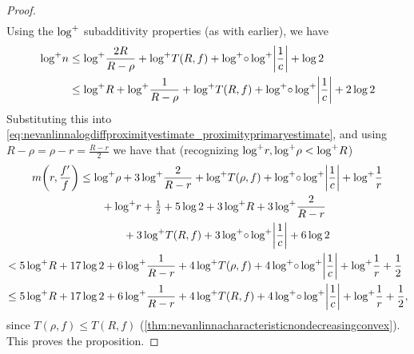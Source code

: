\begin{proof}
\begin{align*}
    \end{align*}
    Using the \(\mathop{\log^+\!}{}\) subadditivity properties (as with earlier), we have
    \begin{align*}
        \logp{n}&\leq\logp{\frac{2R}{R-\rho}}+\logp T(R,f)+\logp\circ\logp\abs{\frac1c}+\log 2\\
        &\leq\logp R+\logp{\frac{1}{R-\rho}}+\logp T(R,f)+\logp\circ\logp\abs{\frac1c}+2\log 2
    \end{align*}
    Substituting this into \cref{eq:nevanlinnalogdiffproximityestimate_proximityprimaryestimate}, and using \(R-\rho=\rho-r=\tfrac{R-r}2\) we have that (recognizing \(\mathop{\log^+\!} r,\mathop{\log^+\!}\rho<\mathop{\log^+\!} R\))
    \begin{multline*}
        \begin{aligned}
            m\qty(r,\frac{f'}f)&\leq\logp\rho+3\logp\frac{2}{R-r}+\logp T(\rho,f)+\logp\circ\logp\abs{\frac1{c}}+\logp\frac{1}{r}\nonumber\\
            &\qquad+\logp r+\tfrac12+5\log2+3\logp R+3\logp{\frac{2}{R-r}}\\
            &\qquad\qquad+3\logp T(R,f)+3\logp\circ\logp\abs{\frac1c}+6\log 2
        \end{aligned}\\
        \begin{aligned}
            {\!}&<5\logp R+17\log 2+6\logp\frac1{R-r}+4\logp T(\rho,f)+4\logp\circ\logp\abs{\frac1c}+\logp\frac1r+\frac12\\
            {\!}&\leq 5\logp R+17\log 2+6\logp\frac1{R-r}+4\logp T(R,f)+4\logp\circ\logp\abs{\frac1c}+\logp\frac1r+\frac12,
        \end{aligned}
    \end{multline*}
    since \(T(\rho,f)\leq T(R,f)\) (\cref{thm:nevanlinnacharacteristicnondecreasingconvex}). This proves the proposition.
\end{proof}
